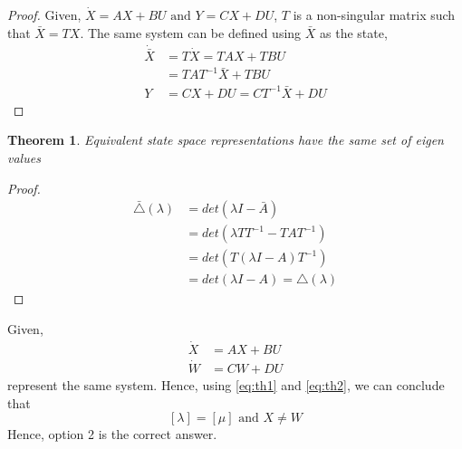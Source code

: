 \documentclass[journal,12pt,twocolumn]{IEEEtran}
\newtheorem{theorem}{Theorem}[section]
\begin{document}
\begin{proof}
Given, $\dot X=AX+BU \text{ and } Y=CX+DU$, $T$ is a non-singular matrix such that $\bar X= TX$. The same system can be defined using $\bar X$ as the state,
\begin{align}
    \dot{\bar X}&=T\dot X=TAX+TBU\\
    &=TAT^{-1}\bar X+TBU\\
    Y&=CX+DU=CT^{-1}\bar X+DU
\end{align}
\end{proof}
\begin{theorem}
Equivalent state space representations have the same set of eigen values
\label{eq:th2}
\end{theorem}
\begin{proof}
\begin{align}
    \bar\triangle(\lambda)&=det(\lambda I-\bar A)\\
    &=det(\lambda TT^{-1}-TAT^{-1})\\
    &=det(T(\lambda I-A)T^{-1})\\
    &=det(\lambda I-A)=\triangle(\lambda)
\end{align}
\end{proof}
Given,
\begin{align}
    \dot X&=AX+BU \\
    \dot W&=CW+DU
\end{align}
represent the same system. Hence, using \eqref{eq:th1} and \eqref{eq:th2}, we can conclude that
$$[\lambda]=[\mu] \text{ and } X\neq W$$
Hence, option 2 is the correct answer.
\end{document}
